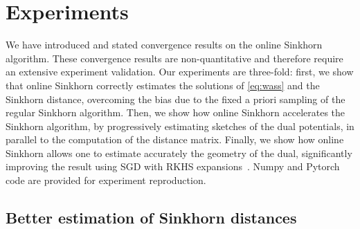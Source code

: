 \section{Experiments}\label{sec:exps}

We have introduced and stated convergence results on the online Sinkhorn
algorithm. These convergence results are non-quantitative and therefore require
an extensive experiment validation. Our experiments are three-fold: first, we
show that online Sinkhorn correctly estimates the solutions of
\eqref{eq:wass} and the Sinkhorn distance, overcoming the bias due to the fixed
a priori sampling of the regular Sinkhorn algorithm. Then, we show how online
Sinkhorn accelerates the Sinkhorn algorithm, by progressively estimating
sketches of the dual potentials, in parallel to the computation of the distance
matrix. Finally, we show how online Sinkhorn allows one to estimate accurately
the geometry of the dual, significantly improving the result using SGD with RKHS
expansions~\citep{2016-genevay-nips}. Numpy and Pytorch code are provided for experiment reproduction.

\subsection{Better estimation of Sinkhorn distances}\label{sec:exp1}





